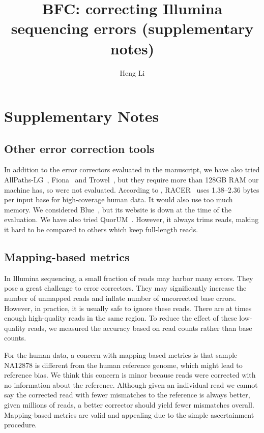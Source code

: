 \documentclass{bioinfo2}
\begin{document}

\title[Error Correction for Illumina Data]{BFC: correcting Illumina sequencing errors (supplementary notes)}
\author[Li]{Heng Li}
\address{Broad Institute, 75 Ames Street, Cambridge, MA 02142, USA}
\maketitle

\section{Supplementary Notes}

\subsection{Other error correction tools}

In addition to the error correctors evaluated in the manuscript, we have also
tried AllPaths-LG~\citep{Gnerre:2011ys}, Fiona~\citep{Schulz:2014aa} and
Trowel~\citep{Lim:2014aa}, but they require more than 128GB RAM our machine
has, so were not evaluated. According to \citet{Molnar:2014aa},
RACER~\citep{Ilie:2013aa} uses 1.38--2.36 bytes per input base for
high-coverage human data. It would also use too much memory. We considered
Blue~\citep{Greenfield:2014aa}, but its website is down at the time of the
evaluation. We have also tried QuorUM~\citep{Zimin:2013aa}.  However, it
always trims reads, making it hard to be compared to others which keep
full-length reads.

\subsection{Mapping-based metrics}

In Illumina sequencing, a small fraction of reads may harbor many errors. They
pose a great challenge to error correctors. They may significantly increase
the number of unmapped reads and inflate number of uncorrected base errors.
However, in practice, it is usually safe to ignore these reads. There are at
times enough high-quality reads in the same region. To reduce the effect
of these low-quality reads, we measured the accuracy based on read counts
rather than base counts.

For the human data, a concern with mapping-based metrics is that sample NA12878
is different from the human reference genome, which might lead to reference
bias. We think this concern is minor because reads were corrected with no
information about the reference. Although given an individual read we cannot say
the corrected read with fewer mismatches to the reference is always better, given
millions of reads, a better corrector should yield fewer mismatches overall.
Mapping-based metrics are valid and appealing due to the simple ascertainment
procedure.
\end{document}
